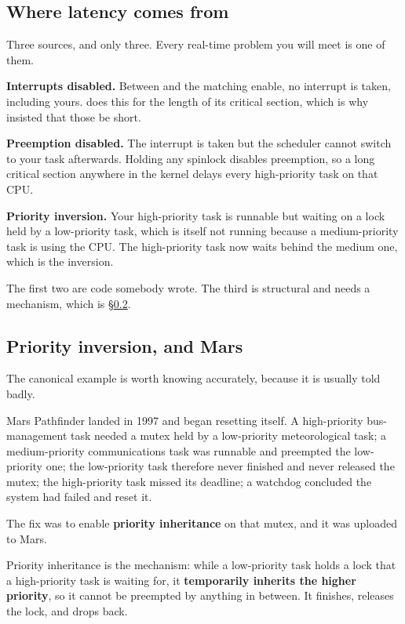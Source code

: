 \subsection{Where latency comes from}
\label{c12:app:a2}

Three sources, and only three. Every real-time problem you will meet is one of them.

\textbf{Interrupts disabled.} Between  and the matching enable, no
interrupt is taken, including yours.  does this for the length of its
critical section, which is why  insisted that those be short.

\textbf{Preemption disabled.} The interrupt is taken but the scheduler cannot switch to your task
afterwards. Holding any spinlock disables preemption, so a long critical section anywhere in the
kernel delays every high-priority task on that CPU.

\textbf{Priority inversion.} Your high-priority task is runnable but waiting on a lock held by a
low-priority task, which is itself not running because a medium-priority task is using the CPU. The
high-priority task now waits behind the medium one, which is the inversion.

The first two are code somebody wrote. The third is structural and needs a mechanism, which is
\S\ref{c12:app:a3}.

\subsection{Priority inversion, and Mars}
\label{c12:app:a3}

The canonical example is worth knowing accurately, because it is usually told badly.

Mars Pathfinder landed in 1997 and began resetting itself. A high-priority bus-management task
needed a mutex held by a low-priority meteorological task; a medium-priority communications task was
runnable and preempted the low-priority one; the low-priority task therefore never finished and
never released the mutex; the high-priority task missed its deadline; a watchdog concluded the
system had failed and reset it.

The fix was to enable \textbf{priority inheritance} on that mutex, and it was uploaded to Mars.

Priority inheritance is the mechanism: while a low-priority task holds a lock that a high-priority
task is waiting for, it \textbf{temporarily inherits the higher priority}, so it cannot be preempted
by anything in between. It finishes, releases the lock, and drops back.

